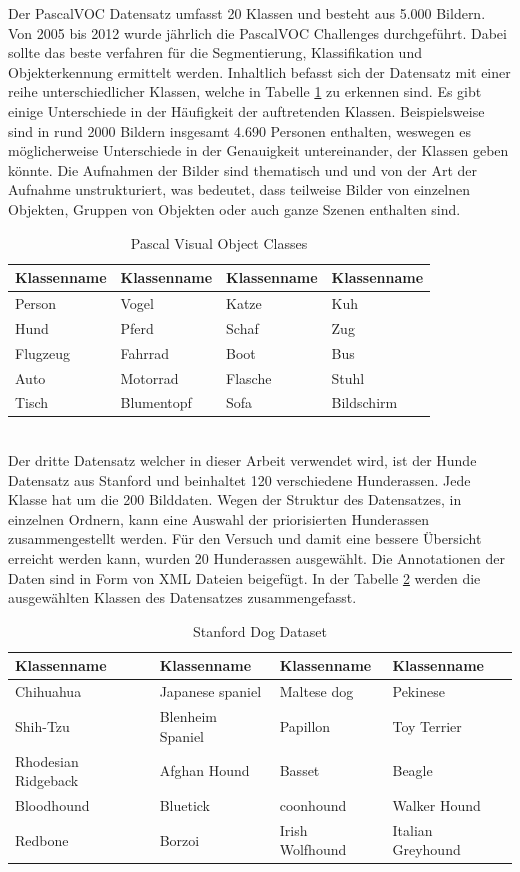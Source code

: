 \documentclass[a4paper,12pt,oneside]{article}
\begin{document}
Der PascalVOC Datensatz umfasst 20 Klassen und besteht aus 5.000 Bildern. Von 2005 bis 2012 wurde jährlich die PascalVOC Challenges durchgeführt. Dabei sollte das beste verfahren für die Segmentierung, Klassifikation und Objekterkennung ermittelt werden. Inhaltlich befasst sich der Datensatz mit einer reihe unterschiedlicher Klassen, welche in Tabelle \ref{tab:pvoc} zu erkennen sind. Es gibt einige Unterschiede in der Häufigkeit der auftretenden Klassen. Beispielsweise sind in rund 2000 Bildern insgesamt 4.690 Personen enthalten, weswegen es möglicherweise Unterschiede in der Genauigkeit untereinander, der Klassen geben könnte. Die Aufnahmen der Bilder sind thematisch und und von der Art der Aufnahme unstrukturiert, was bedeutet, dass teilweise Bilder von einzelnen Objekten, Gruppen von Objekten oder auch ganze Szenen enthalten sind.\\
\begin{table}
[h]
\caption{Pascal Visual Object Classes \cite{pascal-voc-2007}}
\centering
\begin{tabular}{|l|l|l|l|}
\hline
Klassenname & Klassenname & Klassenname & Klassenname\\
\hline
Person & Vogel & Katze & Kuh\\
Hund & Pferd & Schaf & Zug\\
Flugzeug & Fahrrad & Boot & Bus\\
Auto & Motorrad & Flasche & Stuhl\\
Tisch & Blumentopf & Sofa & Bildschirm\\
\hline
\end{tabular}
\label{tab:pvoc}
\end{table}\\
Der dritte Datensatz welcher in dieser Arbeit verwendet wird, ist der Hunde Datensatz aus Stanford und beinhaltet 120 verschiedene Hunderassen. Jede Klasse hat um die 200 Bilddaten. Wegen der Struktur des Datensatzes, in einzelnen Ordnern, kann eine Auswahl der priorisierten Hunderassen zusammengestellt werden. Für den Versuch und damit eine bessere Übersicht erreicht werden kann, wurden 20 Hunderassen ausgewählt. Die Annotationen der Daten sind in Form von XML Dateien beigefügt. In der Tabelle \ref{tab:sdd} werden die ausgewählten Klassen des Datensatzes zusammengefasst.\\
\begin{table}
[h]
\caption{Stanford Dog Dataset \cite{KhoslaYaoJayadevaprakashFeiFei_FGVC2011}}
\label{tab:sdd}
\centering
\begin{tabular}{|l|l|l|l|}
\hline
Klassenname & Klassenname & Klassenname & Klassenname\\
\hline
Chihuahua & Japanese spaniel & Maltese dog & Pekinese\\
Shih-Tzu & Blenheim Spaniel & Papillon & Toy Terrier\\
Rhodesian Ridgeback & Afghan Hound & Basset & Beagle\\
Bloodhound & Bluetick & coonhound & Walker Hound\\
Redbone & Borzoi & Irish Wolfhound & Italian Greyhound\\
\hline
\end{tabular}
\end{table}\\
\end{document}
